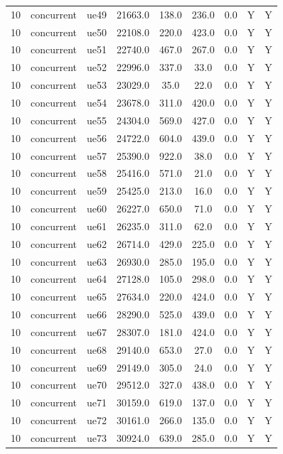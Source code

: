 \begin{table}[ht]
\begin{tabular}{|c|c|c|c|c|c|c|c|c|}
10 & concurrent & ue49 & 21663.0 & 138.0 & 236.0 & 0.0 & Y & Y \\
10 & concurrent & ue50 & 22108.0 & 220.0 & 423.0 & 0.0 & Y & Y \\
10 & concurrent & ue51 & 22740.0 & 467.0 & 267.0 & 0.0 & Y & Y \\
10 & concurrent & ue52 & 22996.0 & 337.0 & 33.0 & 0.0 & Y & Y \\
10 & concurrent & ue53 & 23029.0 & 35.0 & 22.0 & 0.0 & Y & Y \\
10 & concurrent & ue54 & 23678.0 & 311.0 & 420.0 & 0.0 & Y & Y \\
10 & concurrent & ue55 & 24304.0 & 569.0 & 427.0 & 0.0 & Y & Y \\
10 & concurrent & ue56 & 24722.0 & 604.0 & 439.0 & 0.0 & Y & Y \\
10 & concurrent & ue57 & 25390.0 & 922.0 & 38.0 & 0.0 & Y & Y \\
10 & concurrent & ue58 & 25416.0 & 571.0 & 21.0 & 0.0 & Y & Y \\
10 & concurrent & ue59 & 25425.0 & 213.0 & 16.0 & 0.0 & Y & Y \\
10 & concurrent & ue60 & 26227.0 & 650.0 & 71.0 & 0.0 & Y & Y \\
10 & concurrent & ue61 & 26235.0 & 311.0 & 62.0 & 0.0 & Y & Y \\
10 & concurrent & ue62 & 26714.0 & 429.0 & 225.0 & 0.0 & Y & Y \\
10 & concurrent & ue63 & 26930.0 & 285.0 & 195.0 & 0.0 & Y & Y \\
10 & concurrent & ue64 & 27128.0 & 105.0 & 298.0 & 0.0 & Y & Y \\
10 & concurrent & ue65 & 27634.0 & 220.0 & 424.0 & 0.0 & Y & Y \\
10 & concurrent & ue66 & 28290.0 & 525.0 & 439.0 & 0.0 & Y & Y \\
10 & concurrent & ue67 & 28307.0 & 181.0 & 424.0 & 0.0 & Y & Y \\
10 & concurrent & ue68 & 29140.0 & 653.0 & 27.0 & 0.0 & Y & Y \\
10 & concurrent & ue69 & 29149.0 & 305.0 & 24.0 & 0.0 & Y & Y \\
10 & concurrent & ue70 & 29512.0 & 327.0 & 438.0 & 0.0 & Y & Y \\
10 & concurrent & ue71 & 30159.0 & 619.0 & 137.0 & 0.0 & Y & Y \\
10 & concurrent & ue72 & 30161.0 & 266.0 & 135.0 & 0.0 & Y & Y \\
10 & concurrent & ue73 & 30924.0 & 639.0 & 285.0 & 0.0 & Y & Y \\

\end{tabular}
\end{table}

